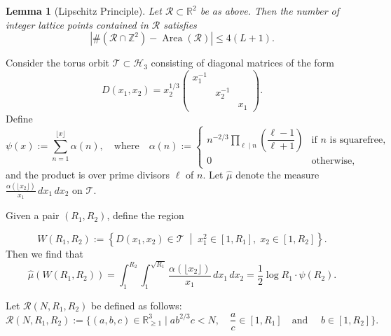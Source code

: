 \documentclass[table]{amsart}
\newtheorem{lemma}[theorem]{Lemma}
\numberwithin{equation}{section}
\begin{document}
\begin{lemma}[Lipschitz Principle]\label{davenport}
Let $\mathcal{R} \subset \mathbb{R}^2$ be as above. Then the number of integer lattice points contained in $\mathcal{R}$ satisfies
$$
\left| \#(\mathcal{R} \cap \mathbb{Z}^2) - \operatorname{Area}(\mathcal{R}) \right| \leq 4(L + 1).
$$
\end{lemma}
\par Consider the torus orbit $\mathcal{T} \subset \mathcal{H}_3$ consisting of diagonal matrices of the form
$$
D(x_1, x_2) = x_2^{1/3} \begin{pmatrix}
x_1^{-1} &  &  \\
 & x_2^{-1} &  \\
 &  & x_1
\end{pmatrix}.
$$
\noindent Define
$$
\psi(x) := \sum_{n = 1}^{\lfloor x \rfloor} \alpha(n),
\quad \text{where} \quad
\alpha(n) := \begin{cases}
n^{-2/3} \displaystyle\prod_{\ell \mid n} \left( \dfrac{\ell - 1}{\ell + 1} \right) & \text{if } n \text{ is squarefree}, \\
0 & \text{otherwise},
\end{cases}
$$
\noindent and the product is over prime divisors $\ell$ of $n$. Let $\hat{\mu}$ denote the measure $\frac{\alpha(\lfloor x_2 \rfloor)}{x_1}\, dx_1\, dx_2$ on $\mathcal{T}$.

\par Given a pair $(R_1, R_2)$, define the region

$$
W(R_1, R_2) := \left\{ D(x_1, x_2) \in \mathcal{T} \;\middle|\; x_1^2 \in [1, R_1], \; x_2 \in [1, R_2] \right\}.
$$
\noindent Then we find that
$$
\hat{\mu}\left(W(R_1, R_2)\right) = \int_1^{R_2} \int_1^{\sqrt{R_1}} \frac{\alpha(\lfloor x_2 \rfloor)}{x_1} \, dx_1 \, dx_2 = \frac{1}{2} \log R_1 \cdot \psi(R_2).
$$

\noindent Let $\mathcal{R}(N, R_1, R_2)$ be defined as follows:
\[\mathcal{R}(N, R_1, R_2):=\{(a,b,c)\in \mathbb{R}^3_{\geq 1}\mid ab^{2/3}c<N, \quad  \frac{a}{c}\in [1,R_1]\quad \text{and }\quad b\in [1, R_2]\}.\]
\end{document}
